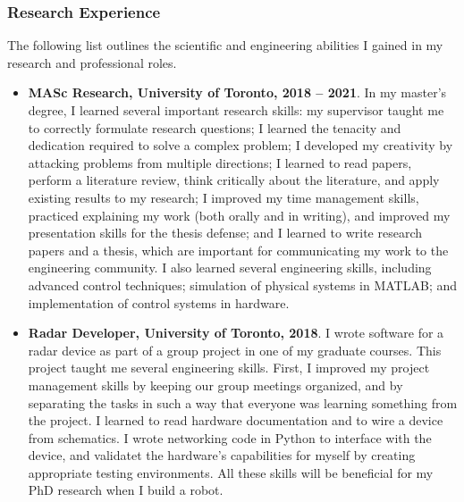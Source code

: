 \documentclass[a4paper,12pt]{article}
\begin{document}
\subsubsection*{Research Experience}
The following list outlines the scientific and engineering abilities I gained in
my research and professional roles.
\begin{itemize}
    \item \textbf{MASc Research, University of Toronto, 2018 -- 2021}.
        In my master's degree, I learned several important research skills:
        my supervisor taught me to correctly formulate research questions;
        I learned the tenacity and dedication required to solve a
        complex problem; I developed my creativity by attacking problems from
        multiple directions; I learned to read papers, perform a literature
        review, think critically about the literature, and apply existing
        results to my research; I improved my time management skills, practiced
        explaining my work (both orally and in writing), and improved my
        presentation skills for the thesis defense; and I learned to write
        research papers and a thesis, which are important for communicating my
        work to the engineering community.
        I also learned several engineering skills, including advanced control
        techniques; simulation of physical systems in MATLAB; and implementation
        of control systems in hardware.

    \item \textbf{Radar Developer, University of Toronto, 2018}.
        I wrote software for a radar device as part of a group project in one of
        my graduate courses.
        This project taught me several engineering skills.
        First, I improved my project management skills by keeping our group
        meetings organized, and by separating the tasks in such a way
        that everyone was learning something from the project.
        I learned to read hardware documentation and to wire a device from
        schematics.
        I wrote networking code in Python to interface with the
        device, and validatet the hardware's capabilities for myself by
        creating appropriate testing environments. 
        All these skills will be beneficial for my PhD research when I build a
        robot.


\end{itemize}
\end{document}
